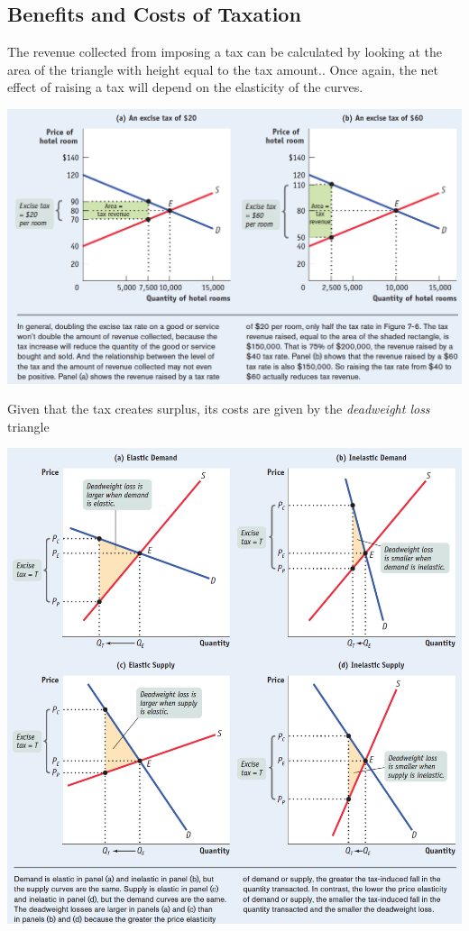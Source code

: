 \documentclass[english,course]{Notes}
\newcommand{\ita}[1]{\textit{#1}}
\begin{document}
\subsection{Benefits and Costs of Taxation}

\par{The revenue collected from imposing a tax can be calculated by looking at the area of the triangle with height equal to the tax amount.. Once again, the net effect of raising a tax will depend on the elasticity of the curves.}

\includegraphics[width=\textwidth]{tax4}

\par{Given that the tax creates surplus, its costs are given by the \ita{deadweight loss} triangle}

\includegraphics[scale=0.5]{tax5}
\end{document}
